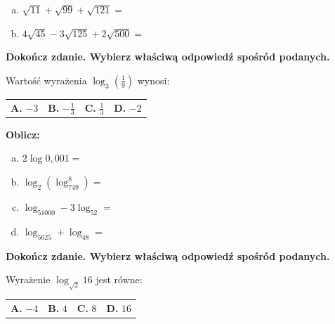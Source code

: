 \documentclass[12pt,a4paper]{article}
\theoremstyle{break}
\begin{document}
	\begin{enumerate}[a)]
		\item $\sqrt{11}+\sqrt{99}+\sqrt{121}=$
		\item $4\sqrt{45}-3\sqrt{125}+2\sqrt{500}=$
	\end{enumerate}
	
	
	\begin{zad}[0-1]
		\textbf{Dokończ zdanie. Wybierz właściwą odpowiedź spośród podanych.}
	\end{zad} 
	
	Wartość wyrażenia $\log_3(\frac{1}{9})$ wynosi:
	
	\vspace{0.5cm}
	\begin{tabular}{p{3.5cm} p{3.5cm} p{3.5cm} p{3.5cm}}
		\textbf{A. }$-3$&
		\textbf{B. }$-\frac{1}{3}$&
		\textbf{C. }$\frac{1}{3}$&
		\textbf{D. }$-2$\\
	\end{tabular}
	
	
	\begin{zad}[0-4]
		\textbf{Oblicz:}
	\end{zad} 
	
	\begin{enumerate}[a)]
		\item $2\log0,001=$
		\item $\log_2(\log_749^8)=$
		\item $\log_51000-3\log_52=$
		\item $\log_5625+\log_48=$
	\end{enumerate}
	
	
	\begin{zad}[0-1]
		\textbf{Dokończ zdanie. Wybierz właściwą odpowiedź spośród podanych.}
	\end{zad} 
	
	Wyrażenie $\log_{\sqrt{2}}16$ jest równe:
	
	\vspace{0.5cm}
	\begin{tabular}{p{3.5cm} p{3.5cm} p{3.5cm} p{3.5cm}}
		\textbf{A. }$-4$&
		\textbf{B. }$4$&
		\textbf{C. }$8$&
		\textbf{D. }$16$\\
	\end{tabular}
	
\end{document}
